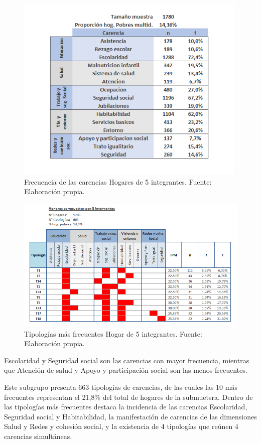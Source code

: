 \documentclass[12pt,letterpaper,spanish]{article}
\begin{document}
\begin{itemize}
    \begin{figure}[H]
        \centering
        \includegraphics[height=9cm]{HOGARES/tabla_num5.png}
        \caption{Frecuencia de las carencias Hogares de 5 integrantes. Fuente: Elaboración propia.}
        \label{fren5}
    \end{figure}
    \begin{figure}[H]
        \centering
        \includegraphics[width=\textwidth]{Mati N/n=5.png}
        \caption{Tipologías más frecuentes Hogar de 5 integrantes. Fuente: Elaboración propia.}
        \label{tipn5}
    \end{figure}
    Escolaridad y Seguridad social son las carencias con mayor frecuencia, mientras que Atención de salud y Apoyo y participación social son las menos frecuentes.
    
    Este subgrupo presenta 663 tipologías de carencias, de las cuales las 10 más frecuentes representan el 21,8\% del total de hogares de la submuetsra. Dentro de las tipologías más frecuentes destaca la incidencia de las carencias Escolaridad, Seguridad social y Habitabilidad, la manifestación de carencias de las dimensiones Salud y Redes y cohesión social, y la existencia de 4 tipologías que reúnen 4 carencias simultáneas. 
    

\end{itemize}
\end{document}
